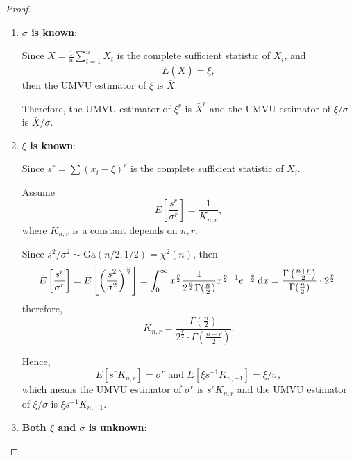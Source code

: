 \begin{proof}
	\begin{enumerate}
		\item \textbf{$\sigma$ is known}:

		      Since $\bar{X}=\frac{1}{n}\sum_{i=1}^{n}X_i$ is the complete sufficient statistic of $X_i$, and
		      \begin{equation*}
			      E(\bar{X})=\xi,
		      \end{equation*}
		      then the UMVU estimator of $\xi$ is $\bar{X}$.

		      Therefore, the UMVU estimator of $\xi^r$ is $\bar{X}^r$ and the UMVU estimator of $\xi/\sigma$ is $\bar{X}/\sigma$.

		\item \textbf{$\xi$ is known}:

		      Since $s^r=\sum\left(x_{i}-\xi\right)^r$ is the complete sufficient statistic of $X_i$.

		      Assume
		      \begin{equation*}
			      E\left[\frac{s^r}{\sigma^r}\right]=\frac{1}{K_{n,r}},
		      \end{equation*}
		      where $K_{n,r}$ is a constant depends on $n,r$.

		      Since $s^2/\sigma^2\sim\text{Ga}(n/2,1/2)=\chi^2(n)$, then
		      \begin{equation*}
			      E\left[\frac{s^r}{\sigma^r}\right]=E\left[\left(\frac{s^2}{\sigma^2}\right)^{\frac{r}{2}}\right]=\int_{0}^{\infty}x^{\frac{r}{2}}\frac{1}{2^{\frac{n}{2}}\Gamma(\frac{n}{2})}x^{\frac{n}{2}-1}e^{-\frac{x}{2}}\mathop{}\!\mathrm{d} x=\frac{\Gamma\left(\frac{n+r}{2}\right)}{\Gamma(\frac{n}{2})}\cdot 2^{\frac{r}{2}}.
		      \end{equation*}
		      therefore,
		      \begin{equation*}
			      K_{n,r}=\frac{\Gamma(\frac{n}{2})}{2^{\frac{r}{2}}\cdot\Gamma\left(\frac{n+r}{2}\right)}.
		      \end{equation*}

		      Hence,
		      \begin{equation*}
			      E\left[s^rK_{n,r}\right]=\sigma^r \text{ and } E[\xi s^{-1}K_{n,-1}]=\xi/\sigma,
		      \end{equation*}
		      which means the UMVU estimator of $\sigma^r$ is $s^rK_{n,r}$ and the UMVU estimator of $\xi/\sigma$ is $\xi s^{-1}K_{n,-1}$.

		\item \textbf{Both $\xi$ and $\sigma$ is unknown}:


\end{enumerate}
\end{proof}

